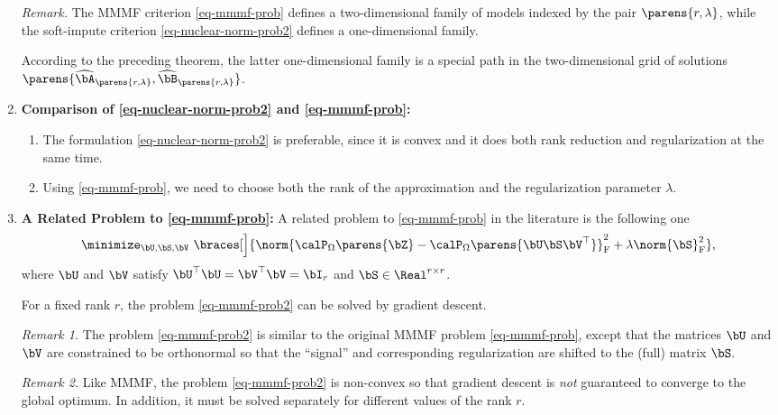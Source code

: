 \documentclass[12pt]{article}
\begin{document}
\begin{enumerate}[label=\textbf{\arabic*.}]
	\textit{Remark.} The MMMF criterion \eqref{eq-mmmf-prob} defines a two-dimensional family of models indexed by the pair $\parens{r, \lambda}$, while the soft-impute criterion \eqref{eq-nuclear-norm-prob2} defines a one-dimensional family. 
	
	According to the preceding theorem, the latter one-dimensional family is a special path in the two-dimensional grid of solutions $\parens{\widehat{\bA}_{\parens{r, \lambda}}, \widehat{\bB}_{\parens{r, \lambda}}}$. 
	
	\item \textbf{Comparison of \eqref{eq-nuclear-norm-prob2} and \eqref{eq-mmmf-prob}:}
	\begin{enumerate}
		\item The formulation \eqref{eq-nuclear-norm-prob2} is preferable, since it is convex and it does both rank reduction and regularization at the same time. 
		\item Using \eqref{eq-mmmf-prob}, we need to choose both the rank of the approximation and the regularization parameter $\lambda$. 
	\end{enumerate}
	
	\item \textbf{A Related Problem to \eqref{eq-mmmf-prob}:} A related problem to \eqref{eq-mmmf-prob} in the literature is the following one 
	\begin{align}\label{eq-mmmf-prob2}
		\minimize_{\bU, \bS, \bV} \ \braces[\Big]{\norm{\calP_{\Omega} \parens{\bZ} - \calP_{\Omega} \parens{\bU \bS \bV^\top}}_{\mathrm{F}}^2 + \lambda \norm{\bS}_{\mathrm{F}}^2}, 
	\end{align}
	where $\bU$ and $\bV$ satisfy $\bU^\top \bU = \bV^\top \bV = \bI_r$ and $\bS \in \Real^{r \times r}$. 
	
	For a fixed rank $r$, the problem \eqref{eq-mmmf-prob2} can be solved by gradient descent. 
	
	\textit{Remark 1.} The problem \eqref{eq-mmmf-prob2} is similar to the original MMMF problem \eqref{eq-mmmf-prob}, except that the matrices $\bU$ and $\bV$ are constrained to be orthonormal so that the ``signal'' and corresponding regularization are shifted to the (full) matrix $\bS$. 
	
	\textit{Remark 2.} Like MMMF, the problem \eqref{eq-mmmf-prob2} is non-convex so that gradient descent is \emph{not} guaranteed to converge to the global optimum. In addition, it must be solved separately for different values of the rank $r$. 

\end{enumerate}
\end{document}
